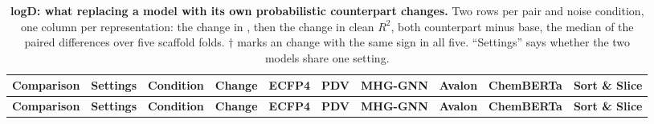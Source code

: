 
{\scriptsize
\begin{longtable}{llllcccccc}
\caption{\textbf{\SuppFile{} logD: what replacing a model with its own probabilistic counterpart changes.}
Two rows per pair and noise condition, one column per representation: the change in \aucnorm{}, then the change in clean $R^2$, both counterpart minus base, the median of the paired differences over five scaffold folds. $\dagger$ marks an \aucnorm{} change with the same sign in all five. ``Settings'' says whether the two models share one setting.}
\label{supp:counterparts_logd}\\
\toprule
\textbf{Comparison} & \textbf{Settings} & \textbf{Condition} & \textbf{Change} & \textbf{ECFP4} & \textbf{PDV} & \textbf{MHG-GNN} & \textbf{Avalon} & \textbf{ChemBERTa} & \textbf{Sort \& Slice} \\
\midrule
\endfirsthead
\toprule
\textbf{Comparison} & \textbf{Settings} & \textbf{Condition} & \textbf{Change} & \textbf{ECFP4} & \textbf{PDV} & \textbf{MHG-GNN} & \textbf{Avalon} & \textbf{ChemBERTa} & \textbf{Sort \& Slice} \\
\midrule
\endhead

\bottomrule
\end{longtable}}
